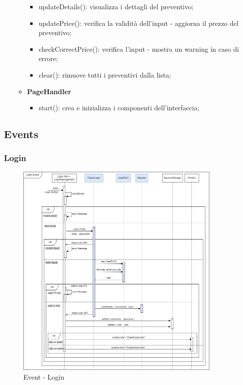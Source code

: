 \documentclass[a4paper, 12pt]{article}
\begin{document}
\begin{itemize}
\begin{itemize}
\begin{itemize}
			\item updateDetails(): visualizza i dettagli del preventivo;
			\item updatePrice(): verifica la validità dell'input - aggiorna il prezzo del preventivo;
			\item checkCorrectPrice(): verifica l'input - mostra un warning in caso di errore;
			\item clear(): rimuove tutti i preventivi dalla lista;
		\end{itemize}
		\item \textbf{PageHandler}
		\begin{itemize}
			\item start(): crea e inizializza i componenti dell'interfaccia;
		\end{itemize}
	\end{itemize}
\end{itemize}
\newpage
\subsection{Events}
\subsubsection{Login}
\begin{figure}[h!]
	\centering
	\includegraphics[width=0.9\textwidth]{RIA_images/LoginEvent.png}
	\caption{Event - Login}
	\label{figure:LoginRIA}
\end{figure}
\newpage
\end{document}
